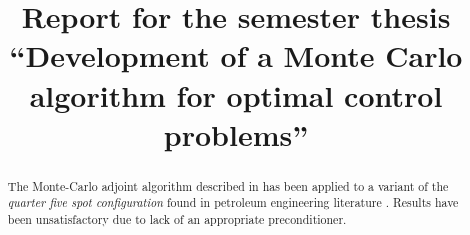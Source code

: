 \documentclass[conference]{IEEEtran}
\begin{document}
\title{Report for the semester thesis ``Development of a Monte Carlo algorithm for optimal control problems''}

\author{
}

\maketitle

\begin{abstract}
The Monte-Carlo adjoint algorithm described in \cite{unsteady} has been applied to a variant of the \emph{quarter five spot configuration} found in petroleum engineering literature \cite{quarterFiveSpot}.
Results have been unsatisfactory due to lack of an appropriate preconditioner.
\end{abstract}
\end{document}

